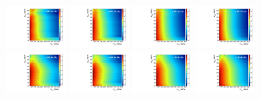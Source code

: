\begin{figure}[htbp]
  \includegraphics[width=0.2\textwidth]{fig/2Dfit/template_nonRes_mu_HP_vbf_LDy.pdf}
  \includegraphics[width=0.2\textwidth]{fig/2Dfit/template_nonRes_e_HP_vbf_LDy.pdf}
  \includegraphics[width=0.2\textwidth]{fig/2Dfit/template_nonRes_mu_LP_vbf_LDy.pdf}
  \includegraphics[width=0.2\textwidth]{fig/2Dfit/template_nonRes_e_LP_vbf_LDy.pdf}\\
  \includegraphics[width=0.2\textwidth]{fig/2Dfit/template_nonRes_mu_HP_bb_HDy.pdf}
  \includegraphics[width=0.2\textwidth]{fig/2Dfit/template_nonRes_e_HP_bb_HDy.pdf}
  \includegraphics[width=0.2\textwidth]{fig/2Dfit/template_nonRes_mu_LP_bb_HDy.pdf}
  \includegraphics[width=0.2\textwidth]{fig/2Dfit/template_nonRes_e_LP_bb_HDy.pdf}\\

\end{figure}

